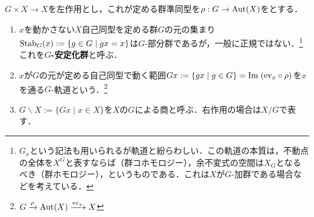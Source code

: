 \documentclass[uplatex,dvipdfmx]{jsreport}
\begin{document}
\begin{definition}
    $G\times X\to X$を左作用とし，これが定める群準同型を$\rho:G\to\mathrm{Aut}(X)$をとする．
    \begin{enumerate}
        \item $x$を動かさない$X$自己同型を定める群$G$の元の集まり$\mathrm{Stab}_G(x):=\{g\in G\mid gx=x\}$は$G$-部分群であるが，一般に正規ではない．\footnote{$G_x$という記法も用いられるが軌道と紛らわしい．この軌道の本質は，不動点の全体を$X^G$と表すならば（群コホモロジー），余不変式の空間は$X_G$となるべき（群ホモロジー），というものである．これは$X$が$G$-加群である場合などを考えている．}
        これを\textbf{$G$-安定化群}と呼ぶ．
        \item $x$が$G$の元が定める自己同型で動く範囲$Gx:=\{gx\mid g\in G\}=\mathrm{Im}\;(\mathrm{ev}_x\circ\rho)$を$x$を通る$G$-軌道という．\footnote{$G\xrightarrow{\rho}\mathrm{Aut}(X)\xrightarrow{\mathrm{ev}_x}X$}
        \item $G\backslash X:=\{Gx\mid x\in X\}$を$X$の$G$による商と呼ぶ．右作用の場合は$X/G$で表す．
    \end{enumerate}
\end{definition}
\end{document}
